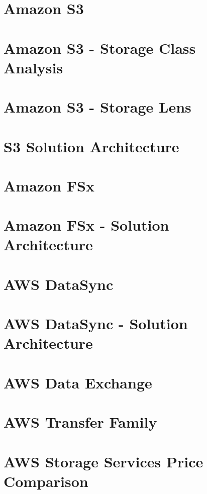 \documentclass[11pt]{book}
\begin{document}
    \section{Amazon S3}


    \section{Amazon S3 - Storage Class Analysis}


    \section{Amazon S3 - Storage Lens}


    \section{S3 Solution Architecture}


    \section{Amazon FSx}


    \section{Amazon FSx - Solution Architecture}


    \section{AWS DataSync}


    \section{AWS DataSync - Solution Architecture}


    \section{AWS Data Exchange}


    \section{AWS Transfer Family}


    \section{AWS Storage Services Price Comparison}
\end{document}
